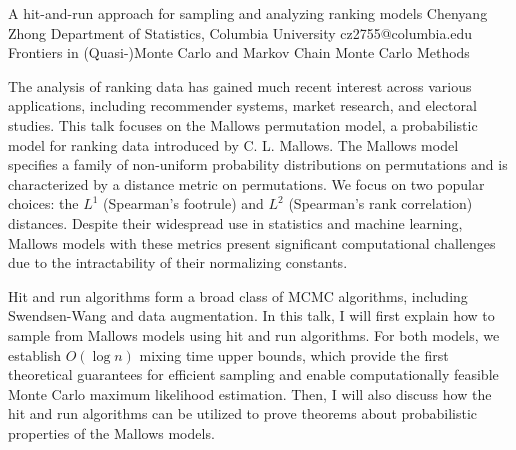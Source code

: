 \begin{talk}
  {A hit-and-run approach for sampling and analyzing ranking models}%
  {Chenyang Zhong}%
  {Department of Statistics, Columbia University}%
  {cz2755@columbia.edu}%
  {}%
  {Frontiers in (Quasi-)Monte Carlo and Markov Chain Monte Carlo Methods}%
    
   
The analysis of ranking data has gained much recent interest across various applications, including recommender systems, market research, and electoral studies. This talk focuses on the Mallows permutation model, a probabilistic model for ranking data introduced by C. L. Mallows. The Mallows model specifies a family of non-uniform probability distributions on permutations and is characterized by a distance metric on permutations. We focus on two popular choices: the $L^1$ (Spearman’s footrule) and $L^2$ (Spearman’s rank correlation) distances. Despite their widespread use in statistics and machine learning, Mallows models with these metrics present significant computational challenges due to the intractability of their normalizing constants.

Hit and run algorithms form a broad class of MCMC algorithms, including Swendsen-Wang and data augmentation. In this talk, I will first explain how to sample from Mallows models using hit and run algorithms. For both models, we establish $O(\log n)$ mixing time upper bounds, which provide the first theoretical guarantees for efficient sampling and enable computationally feasible Monte Carlo maximum likelihood estimation. Then, I will also discuss how the hit and run algorithms can be utilized to prove theorems about probabilistic properties of the Mallows models.

\medskip


\end{talk}

